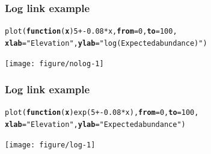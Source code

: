 \documentclass[color=usenames,dvipsnames]{beamer}\usepackage[]{graphicx}\usepackage[]{color}
\makeatletter
\newcommand{\hlnum}[1]{\textcolor[rgb]{0.69,0.494,0}{#1}}%
\newcommand{\hlstr}[1]{\textcolor[rgb]{0.749,0.012,0.012}{#1}}%
\newcommand{\hlopt}[1]{\textcolor[rgb]{0,0,0}{#1}}%
\newcommand{\hlstd}[1]{\textcolor[rgb]{0,0,0}{#1}}%
\newcommand{\hlkwa}[1]{\textcolor[rgb]{0,0,0}{\textbf{#1}}}%
\newcommand{\hlkwc}[1]{\textcolor[rgb]{0,0,0}{\textbf{#1}}}%
\newcommand{\hlkwd}[1]{\textcolor[rgb]{0.004,0.004,0.506}{#1}}%
\newenvironment{kframe}{%
 \def\at@end@of@kframe{}%
 \ifinner\ifhmode%
  \def\at@end@of@kframe{\end{minipage}}%
  \begin{minipage}{\columnwidth}%
 \fi\fi%
 \def\FrameCommand##1{\hskip\@totalleftmargin \hskip-\fboxsep
 \colorbox{shadecolor}{##1}\hskip-\fboxsep
     \hskip-\linewidth \hskip-\@totalleftmargin \hskip\columnwidth}%
 \MakeFramed {\advance\hsize-\width
   \@totalleftmargin\z@ \linewidth\hsize
   \@setminipage}}%
 {\par\unskip\endMakeFramed%
 \at@end@of@kframe}
\newenvironment{knitrout}{}{} %
\makeatother
\begin{document}
\begin{frame}[fragile]
  \frametitle{Log link example}
  \footnotesize
\begin{knitrout}\footnotesize
{}\color{fgcolor}\begin{kframe}
\begin{alltt}
\hlkwd{plot}\hlstd{(}\hlkwa{function}\hlstd{(}\hlkwc{x}\hlstd{)} \hlnum{5} \hlopt{+ -}\hlnum{0.08}\hlopt{*}\hlstd{x,} \hlkwc{from}\hlstd{=}\hlnum{0}\hlstd{,} \hlkwc{to}\hlstd{=}\hlnum{100}\hlstd{,}
     \hlkwc{xlab}\hlstd{=}\hlstr{"Elevation"}\hlstd{,} \hlkwc{ylab}\hlstd{=}\hlstr{"log(Expected abundance)"}\hlstd{)}
\end{alltt}
\end{kframe}
\end{knitrout}
\begin{center}
  \texttt{[image: figure/nolog-1]}
\end{center}
\end{frame}




\begin{frame}[fragile]
  \frametitle{Log link example}
  \footnotesize
\begin{knitrout}\footnotesize
{}\color{fgcolor}\begin{kframe}
\begin{alltt}
\hlkwd{plot}\hlstd{(}\hlkwa{function}\hlstd{(}\hlkwc{x}\hlstd{)} \hlkwd{exp}\hlstd{(}\hlnum{5} \hlopt{+ -}\hlnum{0.08}\hlopt{*}\hlstd{x),} \hlkwc{from}\hlstd{=}\hlnum{0}\hlstd{,} \hlkwc{to}\hlstd{=}\hlnum{100}\hlstd{,}
     \hlkwc{xlab}\hlstd{=}\hlstr{"Elevation"}\hlstd{,} \hlkwc{ylab}\hlstd{=}\hlstr{"Expected abundance"}\hlstd{)}
\end{alltt}
\end{kframe}
\end{knitrout}
\begin{center}
  \texttt{[image: figure/log-1]}
\end{center}
\end{frame}
\end{document}
